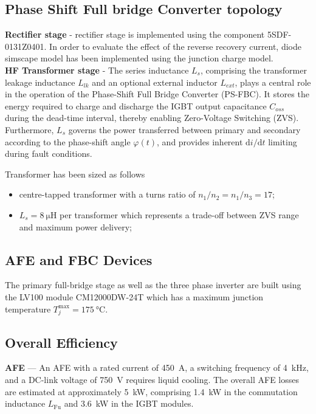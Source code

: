 \documentclass[12pt,a4paper]{scrartcl}
\begin{document}
\begin{onehalfspace}
\subsection{Phase Shift Full bridge Converter topology}

\noindent\textbf{Rectifier stage} - rectifier stage is implemented using the component 5SDF-0131Z0401. In order to evaluate the effect of the reverse recovery current, diode simscape model has been implemented using the junction charge model. \\

\noindent\textbf{HF Transformer stage} - The series inductance $L_s$, comprising the transformer leakage inductance
$L_{lk}$ and an optional external inductor $L_{ext}$, plays a central role in the operation of the Phase-Shift Full Bridge Converter (PS-FBC). It stores the energy required to charge and discharge the IGBT output capacitance $C_{oss}$ during the dead-time interval, thereby enabling Zero-Voltage Switching (ZVS). Furthermore, $L_s$ governs the power transferred between primary and secondary according to the phase-shift angle $\varphi(t)$, and provides inherent $\mathrm{d}i/\mathrm{d}t$ limiting during fault conditions.

Transformer has been sized as follows
\begin{itemize}
	\item[--] centre-tapped transformer with a turns ratio of $n_1/n_2 = n_1/n_3 = 17$;
	\item[--] $L_s = \SI{8}{\micro\henry}$ per transformer which represents a trade-off between ZVS range and maximum power delivery;
\end{itemize}

\subsection{AFE and FBC Devices}
The primary full-bridge stage as well as the three phase inverter are built using the LV100 module CM12000DW-24T which has a maximum junction temperature $T_j^\text{max} = \SI{175}{\celsius}$.

\subsection{Overall Efficiency}

\noindent\textbf{AFE} --- An AFE with a rated current of \SI{450}{\ampere},
a switching frequency of \SI{4}{\kilo\hertz}, and a DC-link voltage of
\SI{750}{\volt} requires liquid cooling. The overall AFE losses are
estimated at approximately \SI{5}{\kilo\watt}, comprising \SI{1.4}{\kilo\watt}
in the commutation inductance $L_\text{Fu}$ and \SI{3.6}{\kilo\watt} in the
IGBT modules.


\end{onehalfspace}
\end{document}
